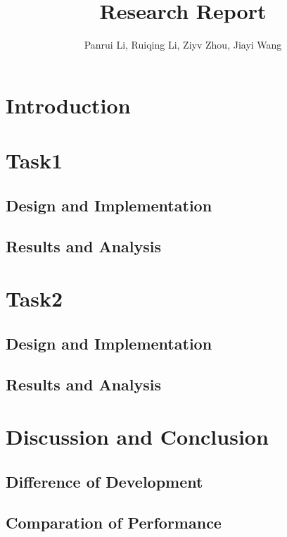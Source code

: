 \documentclass[a4paper,journal]{IEEEtran}
\begin{document}
\title{Research Report}
\author{Panrui Li, Ruiqing Li, Ziyv Zhou, Jiayi Wang}

\maketitle

\begin{abstract}
    \cite{lheeBufferOverflowFormat2003}
\end{abstract}



\section{Introduction}

\section{Task1}
\subsection{Design and Implementation}
\subsection{Results and Analysis}

\section{Task2}
\subsection{Design and Implementation}
\subsection{Results and Analysis}

\section{Discussion and Conclusion}
\subsection{Difference of Development}
\subsection{Comparation of Performance}


\newpage


\end{document}
